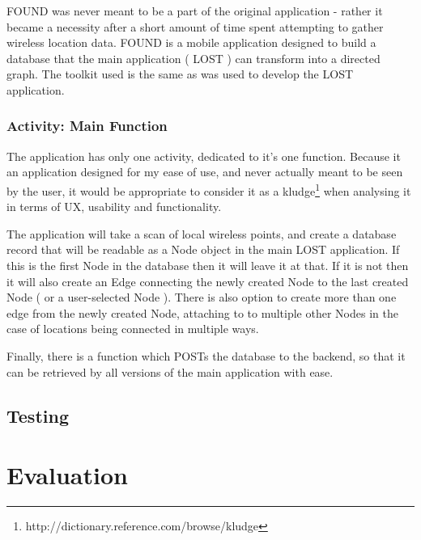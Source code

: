 \documentclass[11pt]{informatics-report}
\begin{document}
FOUND was never meant to be a part of the original application - rather it became a necessity after a short amount of time spent attempting to gather wireless location data. FOUND is a mobile application designed to build a database that the main application ( LOST ) can transform into a directed graph. The toolkit used is the same as was used to develop the LOST application.

\subsection{Activity: Main Function}
The application has only one activity, dedicated to it's one function. Because it an application designed for my ease of use, and never actually meant to be seen by the user, it would be appropriate to consider it as a  kludge\footnote{http://dictionary.reference.com/browse/kludge} when analysing it in terms of UX, usability and functionality.

The application will take a scan of local wireless points, and create a database record that will be readable as a Node object in the main LOST application. If this is the first Node in the database then it will leave it at that. If it is not then it will also create an Edge connecting the newly created Node to the last created Node ( or a user-selected Node ). There is also option to create more than one edge from the newly created Node, attaching to to multiple other Nodes in the case of locations being connected in multiple ways.

Finally, there is a function which POSTs the database to the backend, so that it can be retrieved by all versions of the main application with ease.

\section{Testing}



\chapter{Evaluation}




%
%
%
%
%
%




\appendix

%
%
\end{document}
